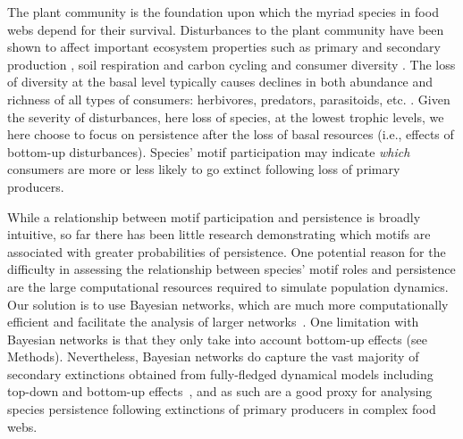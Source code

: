 \documentclass[12pt]{article}
\begin{document}
\begin{spacing}{2.0}
    The plant community is the foundation upon which the myriad species in food webs depend for their survival. Disturbances to the plant community have been shown to affect important ecosystem properties such as primary \citep{Hector1999} and secondary production \citep{borer2012plant}, soil respiration and carbon cycling \citep{chen2019plant} and consumer diversity \citep{scherber2010bottom, Baiser2016}.
    The loss of diversity at the basal level typically causes declines in both abundance and richness of all types of consumers: herbivores, predators, parasitoids, etc. \citep{scherber2010bottom}. Given the severity of disturbances, here loss of species, at the lowest trophic levels, we here choose to focus on persistence after the loss of basal resources (i.e., effects of bottom-up disturbances).
    Species' motif participation may indicate \emph{which} consumers are more or less likely to go extinct following loss of primary producers. 
    
    
    While a relationship between motif participation and persistence is broadly intuitive, so far there has been little research demonstrating which motifs are associated with greater probabilities of persistence.
    One potential reason for the difficulty in assessing the relationship between species' motif roles and persistence are the large computational resources required to simulate population dynamics.
    Our solution is to use Bayesian networks, which are much more computationally efficient and facilitate the analysis of larger networks~\citep{Eklof2013,Haussler2020}.
    One limitation with Bayesian networks is that they only take into account bottom-up effects (see Methods). Nevertheless, Bayesian networks do capture the vast majority of secondary extinctions obtained from fully-fledged dynamical models including top-down and bottom-up effects~\citep{Eklof2013}, and as such are a good proxy for analysing species persistence following extinctions of primary producers in complex food webs.


\end{spacing}
\end{document}
